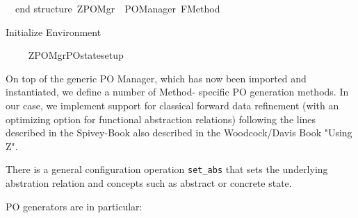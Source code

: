 \begin{isabellebody}
\ \ end\isanewline
\isanewline
structure\ ZPO{\isacharunderscore}Mgr\ {\isacharequal}\ PO{\isacharunderscore}Manager\ {\isacharparenleft}FMethod{\isacharparenright}{\isacharsemicolon}\isanewline
\isanewline
{\isacharverbatimclose}%
\endisatagML
{\isafoldML}%
%
\isadelimML
%
\endisadelimML
%
\begin{isamarkuptext}%
Initialize Environment%
\end{isamarkuptext}%
\isamarkuptrue%
%
\isadelimML
\ \ \ %
\endisadelimML
%
\isatagML
{}\isamarkupfalse%
\ {\isachardoublequoteopen}ZPO{\isacharunderscore}Mgr{\isachardot}PO{\isacharunderscore}state{\isacharunderscore}setup\ {\isachardoublequoteclose}%
\endisatagML
{\isafoldML}%
%
\isadelimML
%
\endisadelimML
%
\isamarkuptrue%
%
\begin{isamarkuptext}%
On top of the generic PO Manager, which has now been
  imported and instantiated, we define a number of Method-
  specific PO generation methods. In our case, we implement
  support for classical forward data refinement (with an
  optimizing option for functional abstraction relations)
  following the lines described in the Spivey-Book also
  described in the Woodcock/Davis Book "Using Z".

  There is a general configuration operation \verb+set_abs+
  that sets the underlying abstration relation and
  concepts such as abstract or concrete state.

  PO generators are in particular:


\end{isamarkuptext}
\end{isabellebody}
